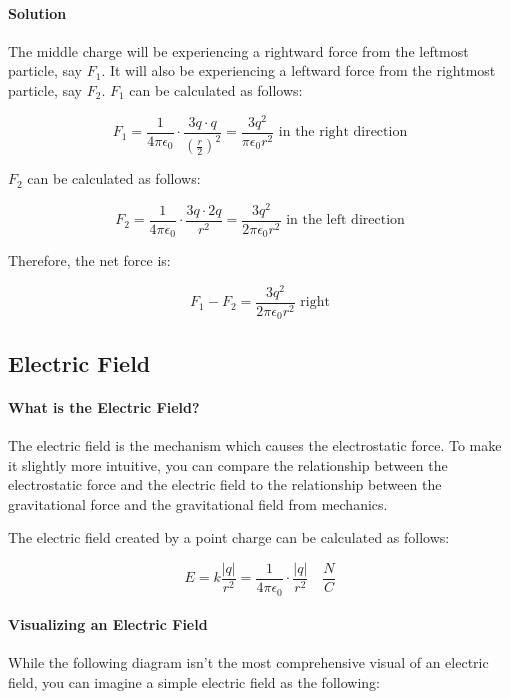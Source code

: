 \documentclass{scrartcl}
\theoremstyle{definition}
\begin{document}
	\paragraph{Solution} The middle charge will be experiencing a rightward force from the leftmost particle, say $F_1$. It will also be experiencing a leftward force from the rightmost particle, say $F_2$. $F_1$ can be calculated as follows:
	
	$$
	F_1 = \frac{1}{4\pi \epsilon_0} \cdot \frac{3q \cdot q}{\left( \frac{r}{2} \right)^2} = \frac{3q^2}{\pi \epsilon_0 r^2} \text{ in the right direction}
	$$
	
	\noindent $F_2$ can be calculated as follows:
	
	$$
	F_2 = \frac{1}{4 \pi \epsilon_0} \cdot \frac{3q \cdot 2q}{r^2} = \frac{3q^2}{2 \pi \epsilon_0 r^2} \text{ in the left direction}
	$$
	
	\noindent Therefore, the net force is:
	
	$$
	F_1 - F_2 = \frac{3q^2}{2 \pi \epsilon_0 r^2} \text{ right}
	$$
	
	\subsection{Electric Field}
	
	\paragraph{What is the Electric Field?} The electric field is the mechanism which causes the electrostatic force. To make it slightly more intuitive, you can compare the relationship between the electrostatic force and the electric field to the relationship between the gravitational force and the gravitational field from mechanics. 
	
	\begin{theorem}
		The electric field created by a point charge can be calculated as follows:
		
		$$
		E = k \frac{|q|}{r^2} = \frac{1}{4 \pi \epsilon_0} \cdot \frac{|q|}{r^2} \quad \frac{N}{C}
		$$
	\end{theorem}
	
	\paragraph{Visualizing an Electric Field} While the following diagram isn't the most comprehensive visual of an electric field, you can imagine a simple electric field as the following:
	
\end{document}
